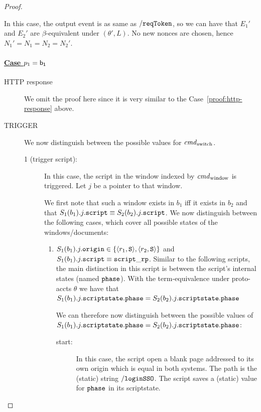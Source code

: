 \begin{proof}
\begin{itemize}
        In this case, the output event is as same as $\mathtt{/reqToken}$, 
        so we can have that $E_1'$ and $E_2'$ are $\beta$-equivalent under $(\theta\prime, L)$.
        No new nonces are chosen, hence $N_1\prime=N_1=N_2=N_2\prime$.
    \end{itemize}

    \paragraph{\underline{Case $p_1 = \mathsf{b_1}$}}

    \begin{description}
      \item[HTTP response] We omit the proof here since it is very similar to the Case~\ref{proof:http-response} above.
      \item[TRIGGER] We now distinguish between the possible values for $\mathit{cmd}_\text{switch}$.
        \begin{description} 
        \item[1 (trigger script):] In this case, the script in the window indexed by $\mathit{cmd}_\text{window}$ is triggered. Let $j$ be a pointer to that window.
            
          We first note that such a window exists in $b_1$ iff it exists in $b_2$ and that $S_1(b_1).j.\mathtt{script} \equiv S_2(b_2).j.\mathtt{script}$. 
          We now distinguish between the following cases, which cover all possible states of the windows/documents:
            
          \begin{enumerate}
          \item $S_1(b_1).j.\mathtt{origin} \in \{\langle r_1,\mathtt{S}\rangle,\langle r_2,\mathtt{S}\rangle\}$ and $S_1(b_1).j.\mathtt{script} \equiv \mathtt{script\_rp}$.
            Similar to the following scripts, the main distinction in this script is between the script's internal states (named $\mathtt{phase}$). 
            With the term-equivalence under proto-accts $\theta$ we have that $S_1(b_1).j.\mathtt{scriptstate}.\mathtt{phase} = S_2(b_2).j.\mathtt{scriptstate}.\mathtt{phase}$ 
              
            We can therefore now distinguish between the possible values of $S_1(b_1).j.\mathtt{scriptstate}.\mathtt{phase} = S_2(b_2).j.\mathtt{scriptstate}.\mathtt{phase}$:
            \begin{description}
            \item[start:] In this case, the script open a blank page addressed to its own origin which is equal in both systems.
              The path is the (static) string $\mathtt{/loginSSO}$. 
              The script saves a (static) value for $\mathtt{phase}$ in its scriptstate.
      

\end{description}
\end{enumerate}
\end{description}
\end{description}
\end{proof}
